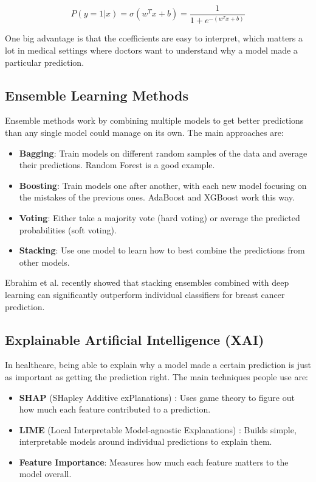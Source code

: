 \documentclass[12pt]{article}
\begin{document}
\begin{equation}
P(y=1|x) = \sigma(w^T x + b) = \frac{1}{1 + e^{-(w^T x + b)}}
\end{equation}

One big advantage is that the coefficients are easy to interpret, which matters a lot in medical settings where doctors want to understand why a model made a particular prediction.

\subsection{Ensemble Learning Methods}

Ensemble methods work by combining multiple models to get better predictions than any single model could manage on its own. The main approaches are:

\begin{itemize}
    \item \textbf{Bagging}: Train models on different random samples of the data and average their predictions. Random Forest is a good example.
    \item \textbf{Boosting}: Train models one after another, with each new model focusing on the mistakes of the previous ones. AdaBoost and XGBoost work this way.
    \item \textbf{Voting}: Either take a majority vote (hard voting) or average the predicted probabilities (soft voting).
    \item \textbf{Stacking}: Use one model to learn how to best combine the predictions from other models.
\end{itemize}

Ebrahim et al. \cite{ebrahim2025} recently showed that stacking ensembles combined with deep learning can significantly outperform individual classifiers for breast cancer prediction.

\subsection{Explainable Artificial Intelligence (XAI)}

In healthcare, being able to explain why a model made a certain prediction is just as important as getting the prediction right. The main techniques people use are:

\begin{itemize}
    \item \textbf{SHAP} (SHapley Additive exPlanations) \cite{lundberg2017}: Uses game theory to figure out how much each feature contributed to a prediction.
    \item \textbf{LIME} (Local Interpretable Model-agnostic Explanations) \cite{ribeiro2016}: Builds simple, interpretable models around individual predictions to explain them.
    \item \textbf{Feature Importance}: Measures how much each feature matters to the model overall.
\end{itemize}
\end{document}
